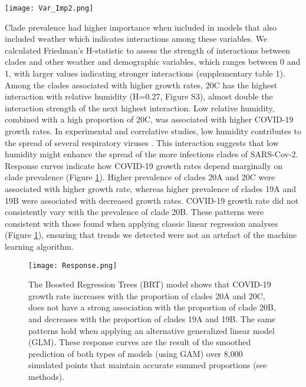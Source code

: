 \documentclass[9pt,twocolumn,twoside,lineno]{pnas-new}
\begin{document}
\begin{SCfigure*}[\sidecaptionrelwidth][t]
\centering
\texttt{[image: Var\_Imp2.png]}
\caption{Relative influence of variables for all models. Error bars indicate 95\% confidence interval.  UV light is the most important variable in all models that contain that variable, however the summed importance of all clades in the weather, demography and mutation model is more important than UV light.}
\label{fig:Var_Importance}
\end{SCfigure*}

Clade prevalence had higher importance when included in models that also included weather which indicates interactions among these variables. We calculated Friedman's H-statistic \cite{Friedman2001-vj, Friedman2008-ep} to assess the strength of interactions \cite{Friedman2008-ep} between clades and other weather and demographic variables, which ranges between 0 and 1, with larger values indicating stronger interactions (supplementary table 1). Among the clades associated with higher growth rates, 20C has the highest interaction with relative humidity (H=0.27, Figure S3), almost double the interaction strength of the next highest interaction. Low relative humidity, combined with a high proportion of 20C, was associated with higher COVID-19 growth rates. In experimental and correlative studies, low humidity contributes to the spread of several respiratory viruses \cite{Merow2020-be, Lowen2007-yi, Paynter2015-th}. This interaction suggests that low humidity might enhance the spread of the more infectious clades of SARS-Cov-2.
Response curves indicate how COVID-19 growth rates depend marginally on clade prevalence (Figure \ref{fig:Response}). Higher prevalence of clades 20A and 20C were associated with higher growth rate, whereas higher prevalence of clades 19A and 19B were associated with decreased growth rates. COVID-19 growth rate did not consistently vary with the prevalence of clade 20B. These patterns were consistent with those found when applying classic linear regression analyses (Figure \ref{fig:Response}), ensuring that trends we detected were not an artefact of the machine learning algorithm. 

\begin{figure}%
\centering
\texttt{[image: Response.png]}
\caption{The Boosted Regression Trees (BRT) model shows that  COVID-19 growth rate increases with the proportion of clades 20A and 20C, does not have a strong association with the proportion of clade 20B, and decreases with the proportion of clades 19A and 19B. The same patterns hold when applying an alternative generalized linear model (GLM). These response curves are the result of the smoothed prediction of both types of models (using GAM) over 8,000 simulated points that maintain accurate summed proportions (see methods).}
\label{fig:Response}
\end{figure}
\end{document}
